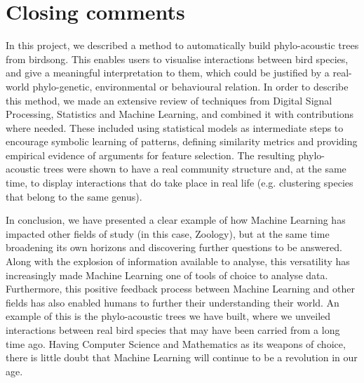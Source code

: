 \documentclass[../main.tex]{subfiles}
\begin{document}
\section{Closing comments}
In this project, we described a method to automatically build phylo-acoustic trees from birdsong. This enables users to visualise interactions between bird species, and give a meaningful interpretation to them, which could be justified by a real-world phylo-genetic, environmental or behavioural relation. In order to describe this method, we made an extensive review of techniques from Digital Signal Processing, Statistics and Machine Learning, and combined it with contributions where needed. These included using statistical models as intermediate steps to encourage symbolic learning of patterns, defining similarity metrics and providing empirical evidence of arguments for feature selection. The resulting phylo-acoustic trees were shown to have a real community structure and, at the same time, to display interactions that do take place in real life (e.g. clustering species that belong to the same genus).
\par In conclusion, we have presented a clear example of how Machine Learning has impacted other fields of study (in this case, Zoology), but at the same time broadening its own horizons and discovering further questions to be answered. Along with the explosion of information available to analyse, this versatility has increasingly made Machine Learning one of tools of choice to analyse data. Furthermore, this positive feedback process between Machine Learning and other fields has also enabled humans to further their understanding their world. An example of this is the phylo-acoustic trees we have built, where we unveiled interactions between real bird species that may have been carried from a long time ago. Having Computer Science and Mathematics as its weapons of choice, there is little doubt that Machine Learning will continue to be a revolution in our age.
\end{document}
